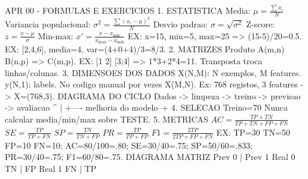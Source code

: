 APR 00 - FORMULAS E EXERCICIOS
1. ESTATISTICA
Media: $\mu=\frac{\sum x_i}{N}$
Variancia populacional: $\sigma^2=\frac{\sum(x_i-\mu)^2}{N}$
Desvio padrao: $\sigma=\sqrt{\sigma^2}$
Z-score: $z=\frac{x-\mu}{\sigma}$
Min-max: $x'=\frac{x-x_{\min}}{x_{\max}-x_{\min}}$
EX: x=15, min=5, max=25 => (15-5)/20=0.5.
EX: [2,4,6], media=4, var=(4+0+4)/3=8/3.
2. MATRIZES
Produto A(m,n) B(n,p) => C(m,p).
EX: [1 2] [3;4] => 1*3+2*4=11.
Transposta troca linhas/colunas.
3. DIMENSOES DOS DADOS
X(N,M): N exemplos, M features.
y(N,1): labels. No codigo manual por vezes X(M,N).
Ex: 768 registos, 3 features -> X=(768,3).
DIAGRAMA DO CICLO
Dados -> limpeza -> treino -> previsao -> avaliacao
             ^                         |
             +---- melhoria do modelo--+
4. SELECAO
Treino=70%
Nunca calcular media/min/max sobre TESTE.
5. METRICAS
$AC=\frac{TP+TN}{TP+TN+FP+FN}$
$SE=\frac{TP}{TP+FN}$
$SP=\frac{TN}{TN+FP}$
$PR=\frac{TP}{TP+FP}$
$F1=\frac{2TP}{2TP+FP+FN}$
EX: TP=30 TN=50 FP=10 FN=10:
AC=80/100=.80; SE=30/40=.75; SP=50/60=.833;
PR=30/40=.75; F1=60/80=.75.
DIAGRAMA MATRIZ
              Prev 0 | Prev 1
Real 0           TN  | FP
Real 1           FN  | TP